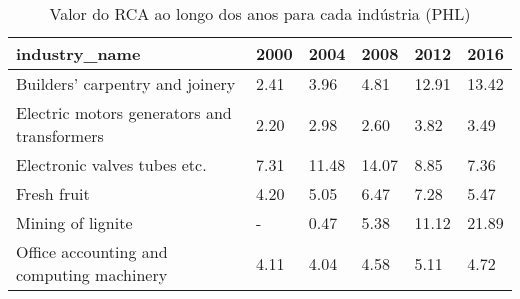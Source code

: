 \begin{table}
\centering
\caption{Valor do RCA ao longo dos anos para cada indústria (PHL)}
\begin{tabular}{p{6cm}p{1.5cm}p{1.5cm}p{1.5cm}p{1.5cm}p{1.5cm}}
\toprule
                              industry\_name & 2000 &  2004 &  2008 &  2012 &  2016 \\
\midrule
            Builders' carpentry and joinery & 2.41 &  3.96 &  4.81 & 12.91 & 13.42 \\
Electric motors generators and transformers & 2.20 &  2.98 &  2.60 &  3.82 &  3.49 \\
               Electronic valves tubes etc. & 7.31 & 11.48 & 14.07 &  8.85 &  7.36 \\
                                Fresh fruit & 4.20 &  5.05 &  6.47 &  7.28 &  5.47 \\
                          Mining of lignite &    - &  0.47 &  5.38 & 11.12 & 21.89 \\
  Office accounting and computing machinery & 4.11 &  4.04 &  4.58 &  5.11 &  4.72 \\
\bottomrule
\end{tabular}
\end{table}
